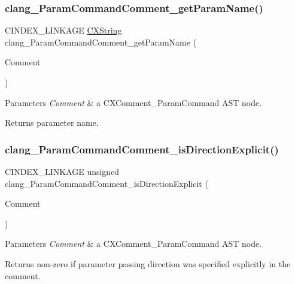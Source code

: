 \subsubsection{\texorpdfstring{clang\+\_\+\+Param\+Command\+Comment\+\_\+get\+Param\+Name()}{clang\_ParamCommandComment\_getParamName()}}
{\footnotesize\ttfamily C\+I\+N\+D\+E\+X\+\_\+\+L\+I\+N\+K\+A\+GE \mbox{\hyperlink{structCXString}{C\+X\+String}} clang\+\_\+\+Param\+Command\+Comment\+\_\+get\+Param\+Name (\begin{DoxyParamCaption}\item[{\mbox{\hyperlink{structCXComment}{C\+X\+Comment}}}]{Comment }\end{DoxyParamCaption})}


\begin{DoxyParams}{Parameters}
{\em Comment} & a {\ttfamily C\+X\+Comment\+\_\+\+Param\+Command} A\+ST node.\\
\hline
\end{DoxyParams}
\begin{DoxyReturn}{Returns}
parameter name. 
\end{DoxyReturn}
\mbox{\label{group__CINDEX__COMMENT_gaf68f19e83ca9b27aec7eb22b065620bd}} 
\subsubsection{\texorpdfstring{clang\+\_\+\+Param\+Command\+Comment\+\_\+is\+Direction\+Explicit()}{clang\_ParamCommandComment\_isDirectionExplicit()}}
{\footnotesize\ttfamily C\+I\+N\+D\+E\+X\+\_\+\+L\+I\+N\+K\+A\+GE unsigned clang\+\_\+\+Param\+Command\+Comment\+\_\+is\+Direction\+Explicit (\begin{DoxyParamCaption}\item[{\mbox{\hyperlink{structCXComment}{C\+X\+Comment}}}]{Comment }\end{DoxyParamCaption})}


\begin{DoxyParams}{Parameters}
{\em Comment} & a {\ttfamily C\+X\+Comment\+\_\+\+Param\+Command} A\+ST node.\\
\hline
\end{DoxyParams}
\begin{DoxyReturn}{Returns}
non-\/zero if parameter passing direction was specified explicitly in the comment. 
\end{DoxyReturn}
\mbox{\label{group__CINDEX__COMMENT_ga92e6422da2a3e428b4452a3e8955ff76}} 

